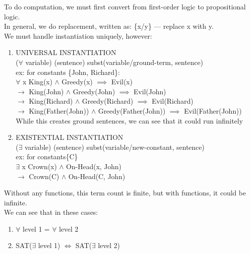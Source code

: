\documentclass[../../lecture_notes.tex]{subfiles}
\begin{document}
\noindent To do computation, we must first convert from first-order logic to propositional logic.\\
In general, we do replacement, written as: \{x/y\} — replace x with y.\\
We must handle instantiation uniquely, however: \begin{enumerate} [itemsep=0mm]
	\item UNIVERSAL INSTANTIATION\\
		($\forall$ variable) (sentence) subst({variable/ground-term}, sentence)\\
		ex: for constants \{John, Richard\}:\\
		$\forall$ x King(x) $\land$ Greedy(x) $\implies$ Evil(x)\\
		$\rightarrow$ King(John) $\land$ Greedy(John) $\implies$ Evil(John)\\
		$\rightarrow$ King(Richard) $\land$ Greedy(Richard) $\implies$ Evil(Richard)\\
		$\rightarrow$ King(Father(John)) $\land$ Greedy(Father(John)) $\implies$ Evil(Father(John))\\
		While this creates ground sentences, we can see that it could run infinitely
	\item EXISTENTIAL INSTANTIATION\\
		($\exists$ variable) (sentence) subst({variable/new-constant}, sentence)\\
		ex: for constants\{C\}\\
		$\exists$ x Crown(x) $\land$ On-Head(x, John)\\
		$\rightarrow$ Crown(C) $\land$ On-Head(C, John)
\end{enumerate}
\noindent Without any functions, this term count is finite, but with functions, it could be infinite.\\
We can see that in these cases:
\begin{enumerate} [itemsep=0mm]
	\item $\forall$ level 1 = $\forall$ level 2
	\item SAT($\exists$ level 1) $\iff$ SAT($\exists$ level 2)
\end{enumerate}
\end{document}
